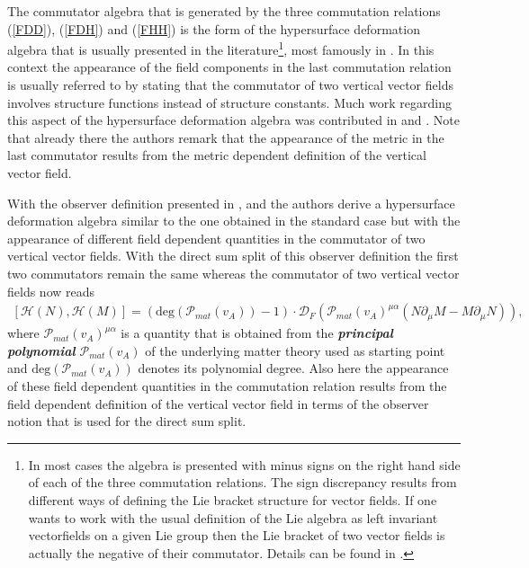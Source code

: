 \documentclass[a4paper,12pt, DIV=14, BCOR=5mm, twoside, headsepline]{scrbook}
\begin{document}
The commutator algebra that is generated by the three commutation relations (\ref{FDD}), (\ref{FDH}) and (\ref{FHH}) is the form of the hypersurface deformation algebra that is usually presented in the literature\footnote{In most cases the algebra is presented with minus signs on the right hand side of each of the three commutation relations. The sign discrepancy results from different ways of defining the Lie bracket structure for vector fields. If one wants to work with the usual definition of the Lie algebra as left invariant vectorfields on a given Lie group then the Lie bracket of two vector fields is actually the negative of their commutator. Details can be found in \cite{1985AnPhy.164..288I}.}, most famously in \cite{HOJMAN197688}. In this context the appearance of the field components in the last commutation relation is usually referred to by stating that the commutator of two vertical vector fields involves structure functions instead of structure constants. Much work regarding this aspect of the hypersurface deformation algebra was contributed in \cite{1985AnPhy.164..288I} and \cite{1985AnPhy.164..316I}. Note that already there the authors remark that the appearance of the metric in the last commutator results from the metric dependent definition of the vertical vector field. 

With the observer definition presented in \cite{2018PhRvD..97h4036D}, \cite{2011PhRvD..83d4047R} and \cite{Rivera} the authors derive a hypersurface deformation algebra similar to the one obtained in the standard case but with the appearance of different field dependent quantities in the commutator of two vertical vector fields. With the direct sum split of this observer definition the first two commutators remain the same whereas the commutator of two vertical vector fields now reads
\begin{align}
    \left[\mathcal{H}(N), \mathcal{H}(M) \right] = \left(\mathrm{deg}(\mathcal{P}_{mat}(v_A)) -1\right ) \cdot  \mathcal{D}_F\left(\mathcal{P}_{mat}(v_A)^{\mu \alpha}( N\partial_{\mu} M - M \partial_{\mu}N  ) \right),
\end{align}
where $\mathcal{P}_{mat}(v_A)^{\mu \alpha}$ is a quantity that is obtained from the \textit{\textbf{principal polynomial}} $\mathcal{P}_{mat}(v_A)$ of the underlying matter theory used as starting point and $\mathrm{deg}(\mathcal{P}_{mat}(v_A))$ denotes its polynomial degree. Also here the appearance of these field dependent quantities in the commutation relation results from the field dependent definition of the vertical vector field in terms of the observer notion that is used for the direct sum split.
\end{document}

